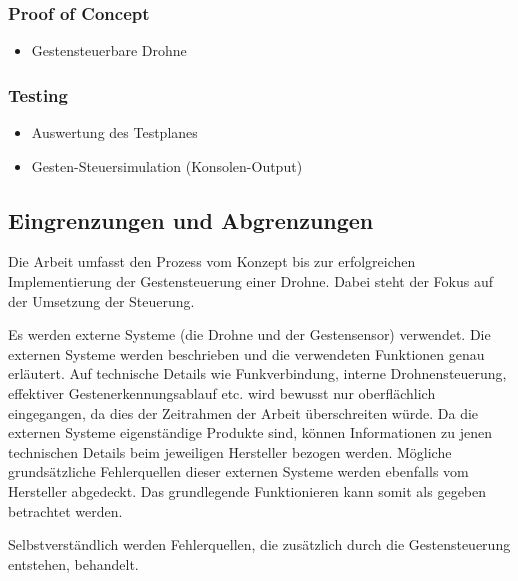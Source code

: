 \subsubsection{Proof of Concept}
\begin{itemize}
	\item Gestensteuerbare Drohne
\end{itemize}

\subsubsection{Testing}
\begin{itemize}
	\item Auswertung des Testplanes
	\item Gesten-Steuersimulation (Konsolen-Output)
\end{itemize}


\subsection{Eingrenzungen und Abgrenzungen}
Die Arbeit umfasst den Prozess vom Konzept bis zur erfolgreichen Implementierung der Gestensteuerung einer Drohne.
Dabei steht der Fokus auf der Umsetzung der Steuerung.

Es werden externe Systeme (die Drohne und der Gestensensor) verwendet.
Die externen Systeme werden beschrieben und die verwendeten Funktionen genau erläutert.
Auf technische Details wie Funkverbindung, interne Drohnensteuerung, effektiver Gestenerkennungsablauf etc. wird bewusst nur oberflächlich eingegangen, da dies der Zeitrahmen der Arbeit überschreiten würde.
Da die externen Systeme eigenständige Produkte sind, können Informationen zu jenen technischen Details beim jeweiligen Hersteller bezogen werden.
Mögliche grundsätzliche Fehlerquellen dieser externen Systeme werden ebenfalls vom Hersteller abgedeckt.
Das grundlegende Funktionieren kann somit als gegeben betrachtet werden.

Selbstverständlich werden Fehlerquellen, die zusätzlich durch die Gestensteuerung entstehen, behandelt.
